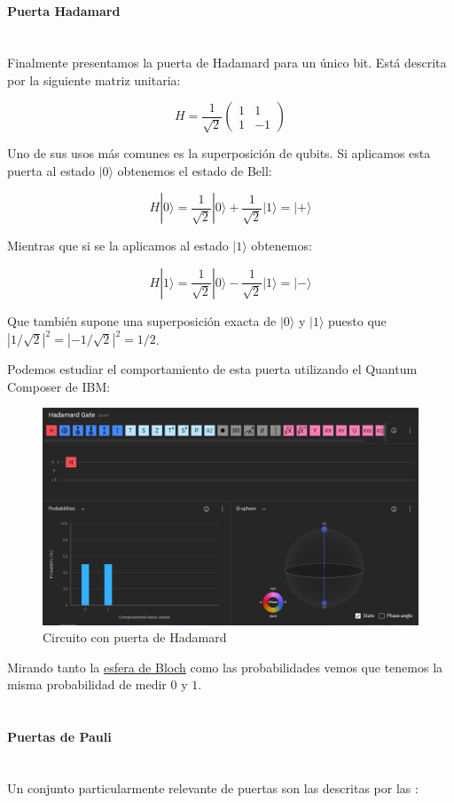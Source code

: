 \documentclass[11pt]{article}
\newcommand{\ra}{\rangle}
\newcommand{\myparagraph}[1]{\paragraph*{ \\ #1}\mbox{}\\}
\theoremstyle{plain}
\begin{document}
\myparagraph{Puerta Hadamard}


Finalmente presentamos la puerta de Hadamard para un único bit. Está descrita por la siguiente matriz unitaria:

\[
	H = \frac{1}{\sqrt 2}
	\begin{pmatrix}
		1 & 1 \\
		1 & -1 
	\end{pmatrix}
\]

Uno de sus usos más comunes es la superposición de qubits. Si aplicamos esta puerta al estado $|0\ra$ obtenemos el estado de Bell:

\[
	H|0\ra = \frac{1}{\sqrt 2} |0\ra + \frac{1}{\sqrt 2} |1\ra = |+\ra
\]

Mientras que si se la aplicamos al estado $|1\ra$ obtenemos:

\[
	H|1\ra = \frac{1}{\sqrt 2} |0\ra - \frac{1}{\sqrt 2} |1\ra = |-\ra
\]

Que también supone una superposición exacta de $|0\ra$ y $|1\ra$ puesto que $|1/\sqrt 2|^2 = |-1/\sqrt 2|^2 = 1/2$.

Podemos estudiar el comportamiento de esta puerta utilizando el Quantum Composer de IBM:

\begin{figure}[H]
	\centering
	\includegraphics[scale=0.5]{figures/gate-hadamard.png}
	\caption{Circuito con puerta de Hadamard}
\end{figure}

Mirando tanto la \href{URL}{esfera de Bloch} como las probabilidades vemos que tenemos la misma probabilidad de medir $0$ y $1$. \\


\myparagraph{Puertas de Pauli}


Un conjunto particularmente relevante de puertas son las descritas por las :
\end{document}
